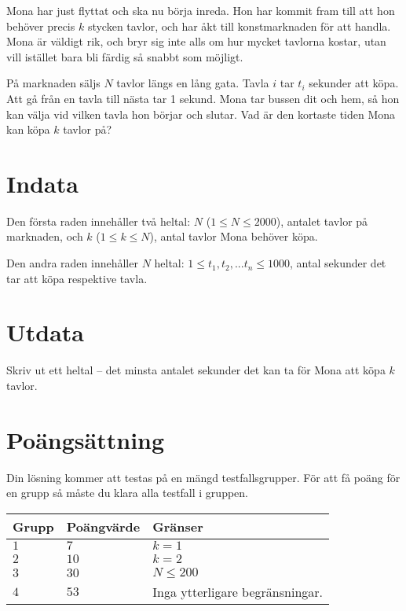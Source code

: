 Mona har just flyttat och ska nu börja inreda. Hon har kommit fram till att hon behöver precis $k$ stycken tavlor, och har åkt till konstmarknaden för att handla. Mona är väldigt rik, och bryr sig inte alls om hur mycket tavlorna kostar, utan vill istället bara bli färdig så snabbt som möjligt. 

På marknaden säljs $N$ tavlor längs en lång gata. Tavla $i$ tar $t_i$ sekunder att köpa. Att gå från en tavla till nästa tar 1 sekund. Mona tar bussen dit och hem, så hon kan välja vid vilken tavla hon börjar och slutar. Vad är den kortaste tiden Mona kan köpa $k$ tavlor på?

\section*{Indata}
Den första raden innehåller två heltal: $N$ ($1 \le N \le 2000$), antalet tavlor på marknaden, och $k$ ($1 \le k \le N$), antal tavlor Mona behöver köpa.

Den andra raden innehåller $N$ heltal: $1 \le t_1,t_2,...t_n \le 1000$, antal sekunder det tar att köpa respektive tavla.

\section*{Utdata}
Skriv ut ett heltal -- det minsta antalet sekunder det kan ta för Mona att köpa $k$ tavlor.

\section*{Poängsättning}
Din lösning kommer att testas på en mängd testfallsgrupper.
För att få poäng för en grupp så måste du klara alla testfall i gruppen.

\noindent
\begin{tabular}{| l | l | l |}
  \hline
  Grupp & Poängvärde & Gränser \\ \hline
  $1$    & $7$        &  $k=1$ \\ \hline 
  $2$    & $10$        &  $k=2$ \\ \hline
  $3$    & $30$        &  $N \le 200$ \\ \hline 
  $4$    & $53$       &  Inga ytterligare begränsningar. \\ \hline
\end{tabular}
